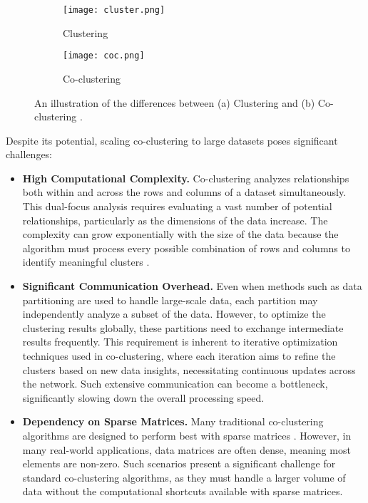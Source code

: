 \begin{figure}[htbp]
    \centering
    \begin{subfigure}[b]{0.22\textwidth}
        \texttt{[image: cluster.png]}
        \caption{Clustering}
        \label{fig:cluster}
    \end{subfigure}
    \hfill
    \begin{subfigure}[b]{0.22\textwidth}
        \texttt{[image: coc.png]}
        \caption{Co-clustering}
        \label{fig:cocluster}
    \end{subfigure}
    \caption{An illustration of the differences between (a) Clustering and (b) Co-clustering \cite{yan2017CoclusteringMultidimensionalBig}.}
    \label{fig:cocomparison}
\end{figure}

Despite its potential, scaling co-clustering to large datasets poses significant challenges:

\begin{itemize}
    \item{\textbf{High Computational Complexity.}} Co-clustering analyzes relationships both within and across the rows and columns of a dataset simultaneously. This dual-focus analysis requires evaluating a vast number of potential relationships, particularly as the dimensions of the data increase. The complexity can grow exponentially with the size of the data because the algorithm must process every possible combination of rows and columns to identify meaningful clusters \cite{hansen2011NonparametricCoclusteringLarge}.
    \item{\textbf{Significant Communication Overhead.}} Even when methods such as data partitioning are used to handle large-scale data, each partition may independently analyze a subset of the data. However, to optimize the clustering results globally, these partitions need to exchange intermediate results frequently. This requirement is inherent to iterative optimization techniques used in co-clustering, where each iteration aims to refine the clusters based on new data insights, necessitating continuous updates across the network. Such extensive communication can become a bottleneck, significantly slowing down the overall processing speed.
    \item{\textbf{Dependency on Sparse Matrices.}} Many traditional co-clustering algorithms are designed to perform best with sparse matrices \cite{pan2008CRDFastCoclusteringa}. However, in many real-world applications, data matrices are often dense, meaning most elements are non-zero. Such scenarios present a significant challenge for standard co-clustering algorithms, as they must handle a larger volume of data without the computational shortcuts available with sparse matrices.
\end{itemize}

